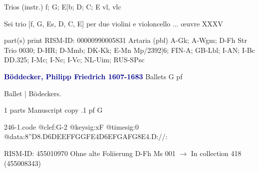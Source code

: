 \documentclass[twocolumn]{book}
\begin{document}
\newline Trios (instr.)  f; G; E|b; D; C; E  
 vl, vlc
\newline \begin{itshape}Sei trio [f, G, Es, D, C, E] per due violini e violoncello ... œuvre XXXV\end{itshape} 
\newline \textcolor{darkblue}{}  part(s)  
\newline print
\newline RISM-ID: 00000990005831
\newline Artaria  (pbl)
\newline A-Gk; A-Wgm; D-Fh  Str Trio 0030; D-HR; D-Mmb; DK-Kk; E-Mn  Mp/2392|6; FIN-A; GB-Lbl; I-AN; I-Bc  DD.325; I-Mc; I-Nc; I-Vc; NL-Uim; RUS-SPsc
\newline \par \vspace{7pt} \textcolor{darkblue}{\textbf{Böddecker, Philipp Friedrich  1607-1683}}
\newline Ballets  G  
\newline pf
\newline \begin{itshape}[f.89v, at left:] Ballet | Bödeckers.\end{itshape} 
\newline \textcolor{darkblue}{}  1 parts  
\newline Manuscript copy
.1  pf  G  
\begin{filecontents*}{246-1.code}
@clef:G-2
@keysig:xF
@timesig:0
@data:8''D{8.D6D}{EEFF}{GGFE}4D{6EFGA}{FG8E}4.D://:
\end{filecontents*}
\newline
%

\newline RISM-ID: 455010970
\newline Ohne alte Foliierung
\newline D-Fh  Ms 001
\newline $\rightarrow$ In collection 418 (455008343)
\end{document}
